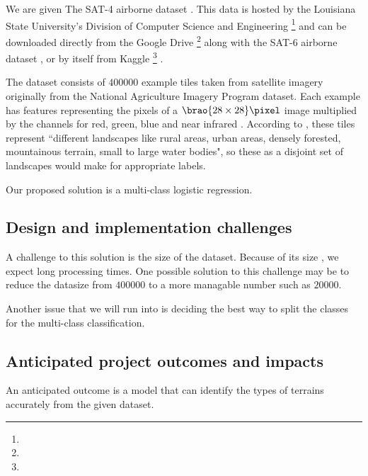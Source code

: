 \documentclass[11pt]{report}
\DeclarePairedDelimiter\brao()%
\begin{document}
We are given
The SAT-4 airborne dataset%
\cite{Basu2015a}.
This data is hosted by the Louisiana State University's Division of Computer Science and Engineering%
\footnote{%
}
and can be downloaded directly from the Google Drive%
\footnote{%
}
along with the SAT-6 airborne dataset%
, or by itself from Kaggle%
\footnote{%
}%
.

The dataset consists of \(\num{400000}\) example tiles
taken from satellite imagery originally from the National Agriculture Imagery Program  dataset.
Each example has features representing the pixels of a \(\SI[parse-numbers=false]{\brao{28\times28}\!}\pixel\) image 
multiplied by the channels for red, green, blue and near infrared .
According to \textcite{Basu2015a},
these tiles represent ``different landscapes like rural areas, urban areas, densely forested, mountainous terrain, small to large water bodies",
so these as a disjoint set of landscapes would make for appropriate labels.

Our proposed solution is a multi-class logistic regression.

\subsection{Design and implementation challenges}

A challenge to this solution is the size of the dataset.
Because of its size , we expect long processing times.
One possible solution to this challenge may be to reduce the datasize
from \(\num{400000}\) to a more managable number such as
\(\num{20000}\).

Another issue that we will run into is deciding the best way to split the classes for the multi-class classification.

\subsection{Anticipated project outcomes and impacts}

An anticipated outcome is a model that can identify the types of terrains accurately from the given dataset.
\end{document}
